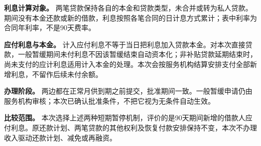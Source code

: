 \documentclass[UTF8,fontset=none,11pt,a4paper]{ctexart}
\begin{document}
\textbf{利息计算对象。} 两笔贷款保持各自的本金和贷款类型，未合并或转为私人贷款。期间没有本金还款或新的借款，利息按照各笔合同的日计息方式累计；表中利率为合同年利率，不是90天费率。


\textbf{应付利息与本金。} 计入应付利息不等于当日把利息加入贷款本金。对本次直接贷款，一般暂缓期间未付利息不因该暂缓结束自动资本化；非补贴贷款延期结束时，尚未支付的应计利息适用计入本金的处理。本次会按服务机构结算安排支付全部新增利息，不留作后续未付余额。


\textbf{办理阶段。} 两边都在正常月供到期之前提交，批准期间一致。一般暂缓申请仍由服务机构审核；本次已确认批准条件，不把它视为无条件自动生效。


\textbf{比较范围。} 本次选择上述两种短期暂停机制，评价的是90天期间新增的借款人应付利息。原还款计划、两笔贷款的其他权利及恢复付款安排保持不变，本次不办理收入驱动还款计划、减免或再融资。
\end{document}
